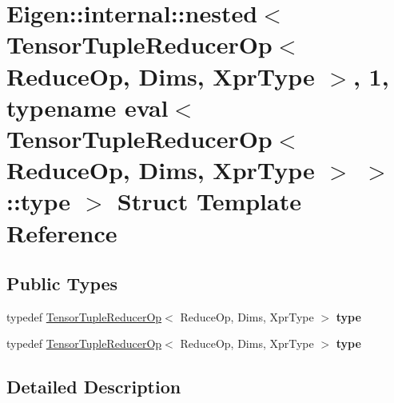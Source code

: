 \hypertarget{struct_eigen_1_1internal_1_1nested_3_01_tensor_tuple_reducer_op_3_01_reduce_op_00_01_dims_00_01_821bbc2beef8f62325eb5ce9ac37fcf5}{}\section{Eigen\+:\+:internal\+:\+:nested$<$ Tensor\+Tuple\+Reducer\+Op$<$ Reduce\+Op, Dims, Xpr\+Type $>$, 1, typename eval$<$ Tensor\+Tuple\+Reducer\+Op$<$ Reduce\+Op, Dims, Xpr\+Type $>$ $>$\+:\+:type $>$ Struct Template Reference}
\label{struct_eigen_1_1internal_1_1nested_3_01_tensor_tuple_reducer_op_3_01_reduce_op_00_01_dims_00_01_821bbc2beef8f62325eb5ce9ac37fcf5}
\subsection*{Public Types}
\begin{DoxyCompactItemize}
\item 
\mbox{\label{struct_eigen_1_1internal_1_1nested_3_01_tensor_tuple_reducer_op_3_01_reduce_op_00_01_dims_00_01_821bbc2beef8f62325eb5ce9ac37fcf5_a2fd021b3b1b4fc8cd840876e76f9a8f7}} 
typedef \hyperlink{class_eigen_1_1_tensor_tuple_reducer_op}{Tensor\+Tuple\+Reducer\+Op}$<$ Reduce\+Op, Dims, Xpr\+Type $>$ {\bfseries type}
\item 
\mbox{\label{struct_eigen_1_1internal_1_1nested_3_01_tensor_tuple_reducer_op_3_01_reduce_op_00_01_dims_00_01_821bbc2beef8f62325eb5ce9ac37fcf5_a2fd021b3b1b4fc8cd840876e76f9a8f7}} 
typedef \hyperlink{class_eigen_1_1_tensor_tuple_reducer_op}{Tensor\+Tuple\+Reducer\+Op}$<$ Reduce\+Op, Dims, Xpr\+Type $>$ {\bfseries type}
\end{DoxyCompactItemize}


\subsection{Detailed Description}
